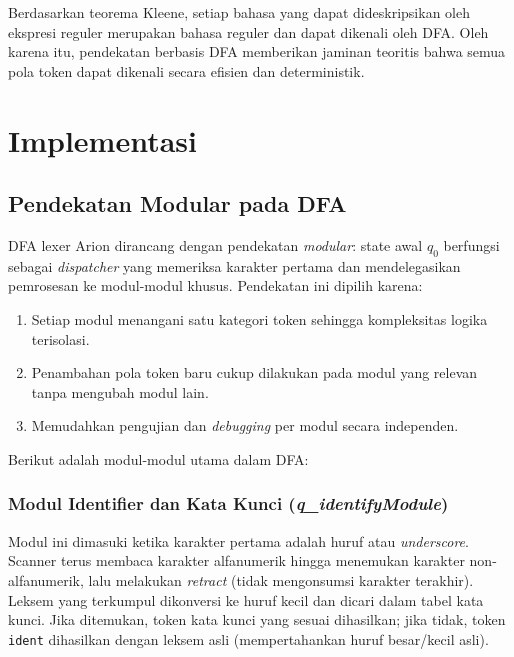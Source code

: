 \documentclass[12pt,a4paper]{article}
\begin{document}
Berdasarkan teorema Kleene, setiap bahasa yang dapat dideskripsikan oleh ekspresi reguler merupakan bahasa reguler dan dapat dikenali oleh DFA. Oleh karena itu, pendekatan berbasis DFA memberikan jaminan teoritis bahwa semua pola token dapat dikenali secara efisien dan deterministik.


\section{Implementasi}

\subsection{Pendekatan Modular pada DFA}
DFA lexer Arion dirancang dengan pendekatan \textit{modular}: state awal $q_0$ berfungsi sebagai \textit{dispatcher} yang memeriksa karakter pertama dan mendelegasikan pemrosesan ke modul-modul khusus. Pendekatan ini dipilih karena:
\begin{enumerate}[label=\arabic*.]
  \item Setiap modul menangani satu kategori token sehingga kompleksitas logika terisolasi.
  \item Penambahan pola token baru cukup dilakukan pada modul yang relevan tanpa mengubah modul lain.
  \item Memudahkan pengujian dan \textit{debugging} per modul secara independen.
\end{enumerate}

Berikut adalah modul-modul utama dalam DFA:

\subsubsection{Modul Identifier dan Kata Kunci (\textit{q\_identifyModule})}
Modul ini dimasuki ketika karakter pertama adalah huruf atau \textit{underscore}. Scanner terus membaca karakter alfanumerik hingga menemukan karakter non-alfanumerik, lalu melakukan \textit{retract} (tidak mengonsumsi karakter terakhir). Leksem yang terkumpul dikonversi ke huruf kecil dan dicari dalam tabel kata kunci. Jika ditemukan, token kata kunci yang sesuai dihasilkan; jika tidak, token \texttt{ident} dihasilkan dengan leksem asli (mempertahankan huruf besar/kecil asli).
\end{document}
